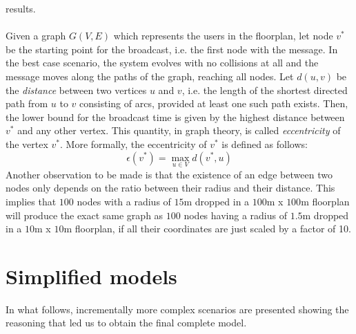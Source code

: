 results.\\
\\
Given a graph $G(V, E)$ which represents the users in the floorplan, let node
$v^{*}$ be the starting point for the broadcast, i.e. the first node with the
message. In the best case scenario, the system evolves with no collisions at all
and the message moves along the paths of the graph, reaching all nodes. Let
$d(u, v)$ be the \textit{distance} between two vertices $u$ and $v$, i.e. the
length of the shortest directed path from $u$ to $v$ consisting of arcs,
provided at least one such path exists. Then, the lower bound for the broadcast
time is given by the highest distance between $v^{*}$ and any other vertex.
This quantity, in graph theory, is called \textit{eccentricity} of the vertex
$v^{*}$. More formally, the eccentricity of $v^{*}$ is defined as follows:
\begin{equation}
\epsilon(v^{*}) = \max_{u{\in}V} d(v^{*}, u)
\end{equation}
Another observation to be made is that the existence of an edge between two
nodes only depends on the ratio between their radius and their distance. This
implies that $100$ nodes with a radius of $15$m dropped in a $100$m x $100$m
floorplan will produce the exact same graph as $100$ nodes having a radius of
$1.5$m dropped in a $10$m x $10$m floorplan, if all their coordinates are just
scaled by a factor of 10.\\ 
\section{Simplified models}
In what follows, incrementally more complex scenarios are presented showing the
reasoning that led us to obtain the final complete model.
